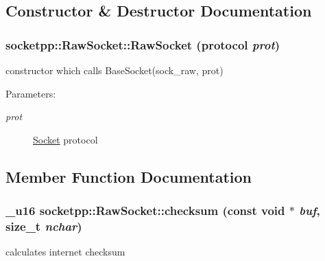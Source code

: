 \subsection{Constructor \& Destructor Documentation}
\hypertarget{classsocketpp_1_1RawSocket_1a77e11388869bc70457efb75cd40b82}{
\subsubsection{\setlength{\rightskip}{0pt plus 5cm}socketpp::RawSocket::RawSocket (protocol {\em prot})}}
\label{classsocketpp_1_1RawSocket_1a77e11388869bc70457efb75cd40b82}


constructor which calls BaseSocket(sock\_\-raw, prot) 

\begin{Desc}
\item[Parameters:]
\begin{description}
\item[{\em prot}]\hyperlink{classsocketpp_1_1Socket}{Socket} protocol \end{description}
\end{Desc}


\subsection{Member Function Documentation}
\hypertarget{classsocketpp_1_1RawSocket_bb78ecebb5bd5ab5be4ee46d786fe5cd}{
\subsubsection{\setlength{\rightskip}{0pt plus 5cm}\_\-u16 socketpp::RawSocket::checksum (const void $\ast$ {\em buf}, \/  size\_\-t {\em nchar})}}
\label{classsocketpp_1_1RawSocket_bb78ecebb5bd5ab5be4ee46d786fe5cd}


calculates internet checksum 

